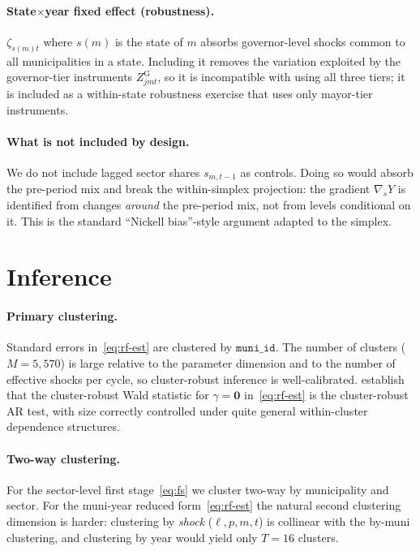 \documentclass{article}
\newcommand{\bzero}{\mathbf{0}}
\theoremstyle{plain}
\theoremstyle{definition}
\theoremstyle{remark}
\begin{document}
\paragraph{State$\times$year fixed effect (robustness).}
$\zeta_{s(m)t}$ where $s(m)$ is the state of $m$ absorbs governor-level shocks
common to all municipalities in a state. Including it removes the variation
exploited by the governor-tier instruments $Z^{\mathrm{G}}_{jmt}$, so it is
incompatible with using all three tiers; it is included as a within-state
robustness exercise that uses only mayor-tier instruments.

\paragraph{What is not included by design.}
We do not include lagged sector shares $s_{m,t-1}$ as controls. Doing so would
absorb the pre-period mix and break the within-simplex projection: the
gradient $\nabla_s Y$ is identified from changes \emph{around} the
pre-period mix, not from levels conditional on it. This is the standard
``Nickell bias''-style argument adapted to the simplex.

\section{Inference}\label{sec:inference}

\paragraph{Primary clustering.}
Standard errors in~\eqref{eq:rf-est} are clustered by $\texttt{muni\_id}$.
The number of clusters ($M=5{,}570$) is large relative to the parameter
dimension and to the number of effective shocks per cycle, so cluster-robust
inference is well-calibrated.
\citet{finlay2009implementing} establish that the cluster-robust Wald
statistic for $\gamma=\bzero$ in~\eqref{eq:rf-est} is the cluster-robust
AR test, with size correctly controlled under quite general within-cluster
dependence structures.

\paragraph{Two-way clustering.}
For the sector-level first stage~\eqref{eq:fs} we cluster two-way by
municipality and sector. For the muni-year reduced form~\eqref{eq:rf-est}
the natural second clustering dimension is harder: clustering by
\emph{shock} ($\ell,p,m,t$) is collinear with the by-muni clustering, and
clustering by year would yield only $T=16$ clusters.
\end{document}

